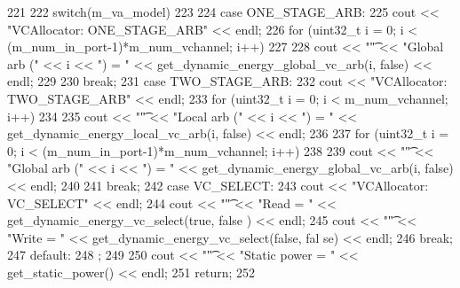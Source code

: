 \begin{DoxyCode}
221 {
222     switch(m_va_model)
223     {
224         case ONE_STAGE_ARB:
225             cout << "VCAllocator: ONE_STAGE_ARB" << endl;
226             for (uint32_t i = 0; i <  (m_num_in_port-1)*m_num_vchannel; i++)
227             {
228                 cout << "\t" << "Global arb (" << i << ") = " << 
      get_dynamic_energy_global_vc_arb(i, false) << endl;
229             }
230             break;
231         case TWO_STAGE_ARB:
232             cout << "VCAllocator: TWO_STAGE_ARB" << endl;
233             for (uint32_t i = 0; i < m_num_vchannel; i++)
234             {
235                 cout << "\t" << "Local arb (" << i << ") = " << 
      get_dynamic_energy_local_vc_arb(i, false) << endl;
236             }
237             for (uint32_t i = 0; i <  (m_num_in_port-1)*m_num_vchannel; i++)
238             {
239                 cout << "\t" << "Global arb (" << i << ") = " << 
      get_dynamic_energy_global_vc_arb(i, false) << endl;
240             }
241             break;
242         case VC_SELECT:
243             cout << "VCAllocator: VC_SELECT" << endl;
244             cout << "\t" << "Read = " << get_dynamic_energy_vc_select(true, false
      ) << endl;
245             cout << "\t" << "Write = " << get_dynamic_energy_vc_select(false, fal
      se) << endl;
246             break;
247         default:
248             ;
249     }
250     cout << "\t" << "Static power = " << get_static_power() << endl;
251     return;
252 }
\end{DoxyCode}


